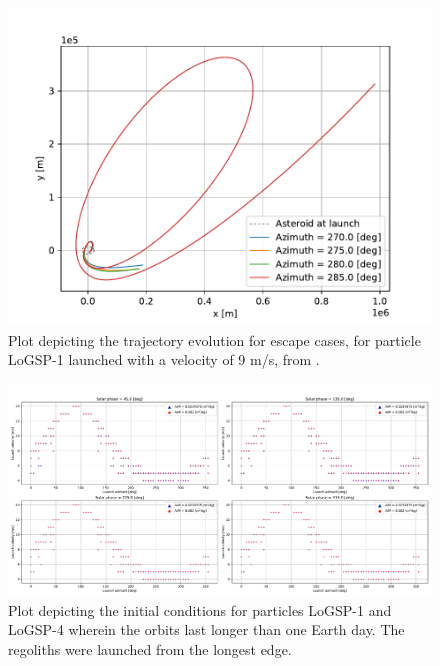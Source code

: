 \documentclass[print]{tudelft-report}
\begin{document}
\begin{appendices}
\begin{figure}[htb]
    \includegraphics[width=\textwidth, height=0.6\textheight, keepaspectratio=true]{Results/Images/trailing_edge_perturbations/logsp1_escape_traj_9ms_solarPhase225.pdf}
    \caption{Plot depicting the trajectory evolution for escape cases, for particle LoGSP-1 launched with a velocity of 9 m/s, from \protect{}.}
    \label{fig:trailingEdge_logsp1_escape_traj_9ms_solar225}
    \end{figure}
    \FloatBarrier
    \begin{figure}[htb]
    \centering
    \captionsetup{justification=centering}
    \includegraphics[width=\textwidth, height=0.6\textheight, keepaspectratio=true]{Results/Images/asteroid_mining/longestEdge_orbitMoreThanOneDay.pdf}
    \caption{Plot depicting the initial conditions for particles LoGSP-1 and LoGSP-4 wherein the orbits last longer than one Earth day. The regoliths were launched from the longest edge.}
    \label{fig:longestEdge_IC_for_24h_orbits}
    \end{figure}

\end{appendices}
\end{document}
